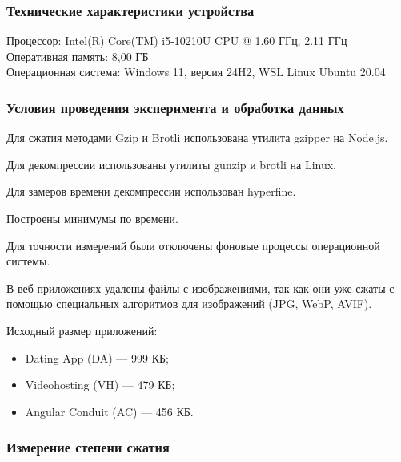 \documentclass[12pt]{article}
\begin{document}
\subsubsection{Технические характеристики устройства}

Процессор: Intel(R) Core(TM) i5-10210U CPU @ 1.60 ГГц, 2.11 ГГц\\
Оперативная память: 8,00 ГБ\\
Операционная система: Windows 11, версия 24H2, WSL Linux Ubuntu 20.04

\subsubsection{Условия проведения эксперимента и обработка данных}

Для сжатия методами Gzip и Brotli использована утилита gzipper на Node.js.

Для декомпрессии использованы утилиты gunzip и brotli на Linux.

Для замеров времени декомпрессии использован hyperfine.

Построены минимумы по времени.

Для точности измерений были отключены фоновые процессы операционной системы.

В веб-приложениях удалены файлы с изображениями, так как они уже сжаты с помощью специальных алгоритмов для изображений (JPG, WebP, AVIF).

Исходный размер приложений:
\begin{itemize}
    \item Dating App (DA) — 999 КБ;
    \item Videohosting (VH) — 479 КБ;
    \item Angular Conduit (AC) — 456 КБ.
\end{itemize}

\subsubsection{Измерение степени сжатия}
\end{document}
